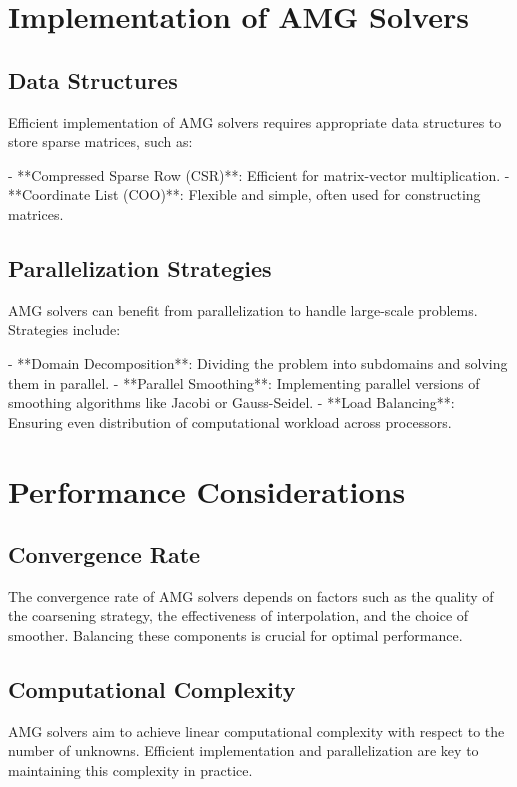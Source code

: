 \section{Implementation of AMG Solvers}

\subsection{Data Structures}

Efficient implementation of AMG solvers requires appropriate data structures to store sparse matrices, such as:

- **Compressed Sparse Row (CSR)**: Efficient for matrix-vector multiplication.
- **Coordinate List (COO)**: Flexible and simple, often used for constructing matrices.

\subsection{Parallelization Strategies}

AMG solvers can benefit from parallelization to handle large-scale problems. Strategies include:

- **Domain Decomposition**: Dividing the problem into subdomains and solving them in parallel.
- **Parallel Smoothing**: Implementing parallel versions of smoothing algorithms like Jacobi or Gauss-Seidel.
- **Load Balancing**: Ensuring even distribution of computational workload across processors.

\section{Performance Considerations}

\subsection{Convergence Rate}

The convergence rate of AMG solvers depends on factors such as the quality of the coarsening strategy, the effectiveness of interpolation, and the choice of smoother. Balancing these components is crucial for optimal performance.

\subsection{Computational Complexity}

AMG solvers aim to achieve linear computational complexity with respect to the number of unknowns. Efficient implementation and parallelization are key to maintaining this complexity in practice.

